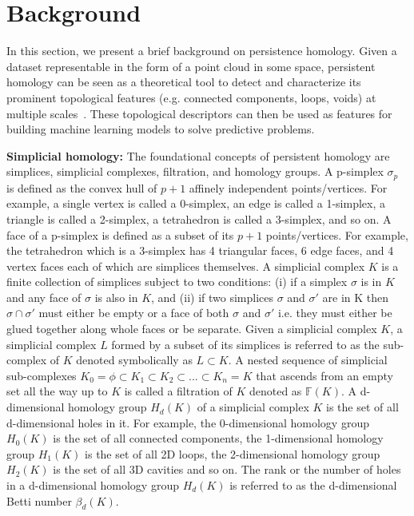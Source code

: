 \documentclass{article}
\begin{document}
\section{Background}
\label{sec:background}
In this section, we present a brief background on persistence homology. Given a dataset representable in the form of a point cloud in some space, persistent homology can be seen as a theoretical tool to detect and characterize its prominent topological features (e.g. connected components, loops, voids) at multiple scales~\cite{Zhu2013}. These topological descriptors can then be used as features for building machine learning models to solve predictive problems. 

\smallskip
\noindent \textbf{Simplicial homology:} The foundational concepts of persistent homology are simplices, simplicial complexes, filtration, and homology groups. A p-simplex $\sigma_p$ is defined as the convex hull of $p+1$ affinely independent points/vertices. For example, a single vertex is called a 0-simplex, an edge is called a 1-simplex, a triangle is called a 2-simplex, a tetrahedron is called a 3-simplex, and so on. A face of a p-simplex is defined as a subset of its $p+1$ points/vertices. For example, the tetrahedron which is a 3-simplex has 4 triangular faces, 6 edge faces, and 4 vertex faces each of which are simplices themselves. A simplicial complex $K$ is a finite collection of simplices subject to two conditions: (i) if a simplex $\sigma$ is in $K$ and any face of $\sigma$ is also in $K$, and (ii) if two simplices $\sigma$ and $\sigma'$ are in K then $\sigma \cap \sigma'$ must either be empty or a face of both $\sigma$ and $\sigma'$ i.e. they must either be glued together along whole faces or be separate. Given a simplicial complex $K$, a simplicial complex $L$ formed by a subset of its simplices is referred to as the sub-complex of $K$ denoted symbolically as $L \subset K$. A nested sequence of simplicial sub-complexes $K_0 = \phi \subset K_1 \subset K_2 \subset ... \subset K_n = K$ that ascends from an empty set all the way up to $K$ is called a filtration of $K$ denoted as $\mathbb{F}(K)$. A d-dimensional homology group $H_d(K)$ of a simplicial complex $K$ is the set of all d-dimensional holes in it. For example, the 0-dimensional homology group $H_0(K)$ is the set of all connected components, the 1-dimensional homology group $H_1(K)$ is the set of all 2D loops, the 2-dimensional homology group $H_2(K)$ is the set of all 3D cavities and so on. The rank or the number of holes in a d-dimensional homology group $H_d(K)$ is referred to as the d-dimensional Betti number $\beta_d(K)$. 
\end{document}
